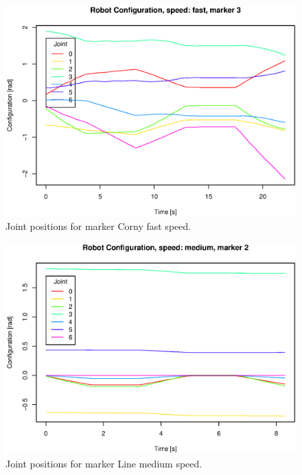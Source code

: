 \begin{figure}[H]\centering\includegraphics[width=\fullImageWidth]{graphics/rovi_robot_configuration_fast_marker3.eps}  \caption{Joint positions for marker Corny  fast speed.  }     \label{fig:rovi_joint_pos_F_Corny }   \end{figure}
\begin{figure}[H]\centering\includegraphics[width=\fullImageWidth]{graphics/rovi_robot_configuration_medium_marker2.eps}\caption{Joint positions for marker Line   medium speed.}     \label{fig:rovi_joint_pos_M_Line  }   \end{figure}
